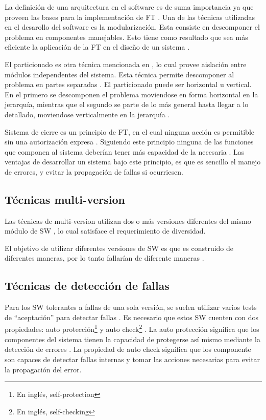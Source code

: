 La definición de una arquitectura en el software es de suma importancia ya que proveen las bases para 
la implementación de \ac{FT} \citep{SoftwareFaultToleranceATutorial}. Una de las técnicas utilizadas 
en el desarollo del software es la modularización. Esta consiste en descomponer el problema en 
componentes manejables. Esto tiene como resultado que sea más eficiente la aplicación de la \ac{FT} 
en el diseño de un sistema \citep{SoftwareFaultToleranceATutorial}. 

El particionado es otra técnica mencionada en \cite{SoftwareFaultToleranceATutorial}, lo cual 
provee aislación entre módulos independentes del sistema. Esta técnica permite descomponer al 
problema en partes separadas \citep{pressman01}. El particionado puede ser horizontal u 
vertical. En el primero se descomponen el problema moviendose en forma horizontal en la jerarquía, 
mientras que el segundo se parte de lo más general hasta llegar a lo detallado, moviendose 
verticalmente en la jerarquía \citep{pressman01}. 

Sistema de cierre es un principio de \ac{FT}, en el cual ninguna acción es permitible sin una 
autorización expresa \citep{SoftwareFaultToleranceATutorial}. Siguiendo este principio ninguna de 
las funciones que componen al sistema deberían tener más capacidad de la necesaria 
\citep{SoftwareFaultToleranceATutorial}. Las ventajas de desarrollar un sistema bajo este principio, 
es que es sencillo el manejo de errores, y evitar la propagación de fallas si ocurriesen. 

\subsection{Técnicas multi-version}
Las técnicas de multi-version utilizan dos o más versiones diferentes del mismo módulo de \ac{SW} 
\citep{FTDesign} \citep{SoftwareFaultToleranceATutorial}, lo cual satisface el requerimiento de 
diversidad. 

El objetivo de utilizar diferentes versiones de \ac{SW} es que es construido de diferentes 
maneras, por lo tanto fallarían de diferente maneras \citep{SoftwareFaultToleranceATutorial}.

\subsection{Técnicas de detección de fallas}
Para los \ac{SW} tolerantes a fallas de una sola versión, se suelen utilizar varios tests de 
``aceptación'' para detectar fallas \citep{FTDesign}. Es necesario que estos \ac{SW} cuenten con 
dos propiedades: auto protección\footnote{En inglés, self-protection} y auto check\footnote{En 
inglés, self-checking} \citep{SoftwareFaultToleranceATutorial}. La auto protección significa que  
los componentes del sistema tienen la capacidad de protegerse así mismo mediante la detección de 
errores \citep{SoftwareFaultToleranceATutorial}. La propiedad de auto check significa que los 
componente son capaces de detectar fallas internas y tomar las acciones necesarias para evitar la 
propagación del error. 

